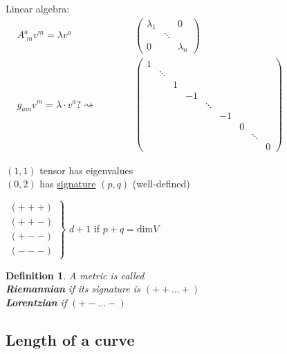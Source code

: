\documentclass[10pt]{amsart}
\newtheorem{definition}{Definition}
\begin{document}
\begin{multicols*}{2}
	Linear algebra: \quad \quad \, $ \begin{aligned} & A^a_{\,\,m}v^m = \lambda v^a & \quad \quad \quad \, \left( \begin{matrix} \lambda_1 & & 0 \\
	& \ddots & \\ 
	0 & & \lambda_n \end{matrix} \right) \\
	& g_{am} v^m = \lambda \cdot v^a ? \rightsquigarrow  & \quad \quad \quad \, \left( \begin{matrix} 
	1        &   &    &        &    &   &        & \\
	& \ddots &   &    &        &    &   &        & \\
	&        & 1 &    &        &    &   &        & \\
	&        &   & -1 &        &    &   &        & \\
	&        &   &    & \ddots &    &   &        & \\
	&        &   &    &        & -1 &   &        & \\
	&        &   &    &        &    & 0 &        & \\
	&        &   &    &        &    &   & \ddots & \\
	&        &   &    &        &    &   &        & 0 \end{matrix} \right)
	\end{aligned}$
	
	$(1,1)$ tensor has eigenvalues \\
	$(0,2)$ has \underline{signature} $(p,q)$ (well-defined)
	
	$\left. \begin{aligned}
	(+++) \\
	(++-) \\
	(+--) \\
	(---) \end{aligned} \right\rbrace$ $d+1$ if $p+q = \text{dim}V$
	
	
	\begin{definition} A metric is called  \\
		\textbf{Riemannian} if its signature is $(++ \dots +)$ \\
		\textbf{Lorentzian} if $(+-\dots -)$ 
	\end{definition}
	
	
	\subsection{Length of a curve}
	

\end{multicols*}
\end{document}
